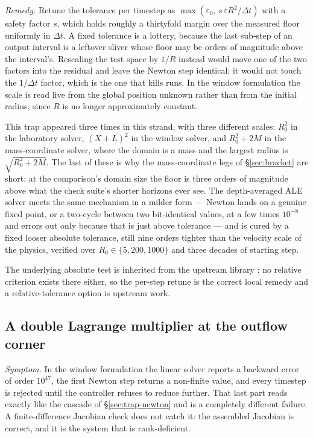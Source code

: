 \documentclass[11pt,a4paper]{article}
\begin{document}
\emph{Remedy.} Retune the tolerance per timestep as
$\max(\varepsilon_{0}, \, s\,\varepsilon R^{2}/\Delta t)$ with a safety factor
$s$, which holds roughly a thirtyfold margin over the measured floor uniformly
in $\Delta t$. A fixed tolerance is a lottery, because the last sub-step of an
output interval is a leftover sliver whose floor may be orders of magnitude
above the interval's. Rescaling the test space by $1/R$ instead would move one
of the two factors into the residual and leave the Newton step identical; it
would not touch the $1/\Delta t$ factor, which is the one that kills runs. In
the window formulation the scale is read live from the global position unknown
rather than from the initial radius, since $R$ is no longer approximately
constant.

This trap appeared three times in this strand, with three different scales:
$R_{0}^{2}$ in the laboratory solver, $(X+L)^{2}$ in the window solver, and
$R_{0}^{2}+2M$ in the mass-coordinate solver, where the domain is a mass and the
largest radius is $\sqrt{R_{0}^{2}+2M}$. The last of these is why the
mass-coordinate legs of \S\ref{sec:bracket} are short: at the comparison's
domain size the floor is three orders of magnitude above what the check suite's
shorter horizons ever see. The depth-averaged ALE solver meets the same
mechanism in a milder form --- Newton lands on a genuine fixed point, or a
two-cycle between two bit-identical values, at a few times $10^{-8}$ and errors
out only because that is just above tolerance --- and is cured by a fixed looser
absolute tolerance, still nine orders tighter than the velocity scale of the
physics, verified over $R_{0}\in\{5,200,1000\}$ and three decades of starting
step.

The underlying absolute test is inherited from the upstream library
\cite{heil2006}; no relative criterion exists there either, so the per-step
retune is the correct local remedy and a relative-tolerance option is upstream
work.

\subsection{A double Lagrange multiplier at the outflow corner}
\label{sec:trap-corner}

\emph{Symptom.} In the window formulation the linear solver reports a backward
error of order $10^{47}$, the first Newton step returns a non-finite value, and
every timestep is rejected until the controller refuses to reduce further. That
last part reads exactly like the cascade of \S\ref{sec:trap-newton} and is a
completely different failure. A finite-difference Jacobian check does not catch
it: the assembled Jacobian is correct, and it is the system that is
rank-deficient.
\end{document}

